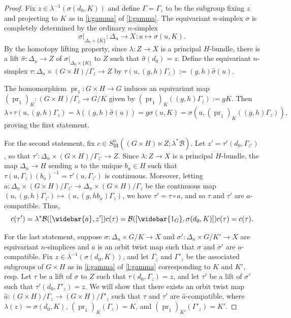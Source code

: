 \documentclass[12pt,reqno]{amsart}
\newcommand{\calB}{{\mathcal{B}}}
\newcommand{\pr}{{\operatorname{pr}}} %
\theoremstyle{plain}
\theoremstyle{definition}
\newcommand{\BI}{{\operatorname{BI}}} %
\begin{document}
    \begin{proof}  
        Fix $z\in\lambda^{-1}(\sigma(d_0,K))$ and define   $\Gamma=\Gamma_z$ to be the subgroup fixing $z$ and projecting to $K$ as in \cref{i:gamma} of \cref{l:gamma}.   The equivariant $n$-simplex $\sigma$ is completely determined by the ordinary $n$-simplex $$\sigma|_{\Delta_n\times\{K\}}\colon\Delta_n\to X\colon u\mapsto \sigma(u,K).$$  By the homotopy lifting property, since $\lambda\colon Z\to X$ is a principal $H$-bundle, there is a lift $\widehat{\sigma}\colon\Delta_n\to Z$ of $\sigma|_{\Delta_n\times\{K\}}$ to $Z$ such that $\widehat{\sigma}(d_0)=z$.  Define the equivariant $n$-simplex $\tau\colon\Delta_n\times(G\times H)/\Gamma_z\to Z$ by $\tau(u,(g,h)\Gamma_z):=(g,h)\widehat{\sigma}(u)$.

        The homomorphism $\pr_1\colon G\times H\to G$ induces an equivariant map $(\pr_1)_K\colon (G\times H)/\Gamma_z\to G/K$ given by $(\pr_1)_K((g,h)\Gamma_z):=gK.$  Then $$\lambda\circ\tau(u,(g,h)\Gamma_z)=\lambda((g,h)\widehat{\sigma}(u))=g\sigma(u,K)=\sigma(u,(\pr_1)_K((g,h)\Gamma_z)),$$ proving the first statement.

        For the second statement, fix $c\in S_\BI^n((G\times H)\ltimes Z;\lambda^*\calB)$. Let $z'=\tau'(d_0,\Gamma_{z'})$, so that  $\tau'\colon\Delta_n\times(G\times H)/\Gamma_{z'}\to Z$.   Since $\lambda\colon Z\to X$ is a principal $H$-bundle, the map $\Delta_n\to H$ sending $u$ to the unique $b_u\in H$ such that $\tau(u,\Gamma_z)(b_u)^{-1}=\tau'(u,\Gamma_{z'})$ is continuous.  Moreover, letting $a\colon\Delta_n\times(G\times H)/\Gamma_{z'}\to\Delta_n\times(G\times H)/\Gamma_z$ be the continuous map $(u,(g,h)\Gamma_{z'})\mapsto(u,(g,hb_u)\Gamma_z)$, we have $\tau'=\tau\circ a$, and so $\tau$ and $\tau'$ are $a$-compatible.  Thus, $$c(\tau')=\lambda^*\calB([\widebar{a},z'])c(\tau)=\calB([\widebar{1_G},\sigma(d_0,K)])c(\tau)=c(\tau).$$

        For the last statement, suppose $\sigma\colon\Delta_n\times G/K\to X$ and $\sigma'\colon\Delta_n\times G/K'\to X$ are equivariant $n$-simplices and $a$ is an orbit twist map such that $\sigma$ and $\sigma'$ are $a$-compatible.  Fix $z\in\lambda^{-1}(\sigma(d_0,K))$, and let $\Gamma_z$ and $\Gamma'_z$ be the associated subgroups of $G\times H$ as in \cref{i:gamma} of \cref{l:gamma} corresponding to $K$ and $K'$, resp.     Let $\tau$ be a lift of $\sigma$ to $Z$ such that $\tau(d_0,\Gamma_z)=z$, and let $\tau'$ be a lift of $\sigma'$ such that $\tau'(d_0,\Gamma'_z)=z$. We will show that there exists an orbit twist map $\widehat{a}\colon (G\times H)/\Gamma_z\to(G\times H)/\Gamma'_z$ such that $\tau$ and $\tau'$ are $\widehat{a}$-compatible, where $\lambda(z)=\sigma(d_0,K)$, $(\pr_1)_K(\Gamma_z)=K$, and $(\pr_1)_{K'}(\Gamma'_z)=K'$.
        

\end{proof}
\end{document}
